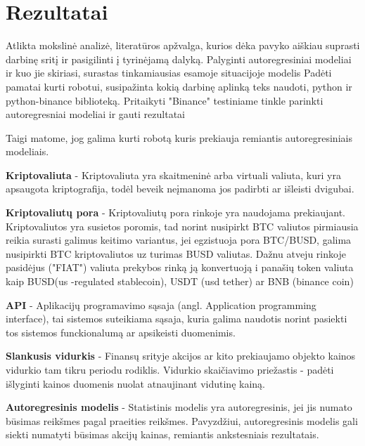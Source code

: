 \documentclass{VUMIFInfKursinis}
\begin{document}

\section{Rezultatai}
Atlikta mokslinė analizė, literatūros apžvalga, kurios dėka pavyko aiškiau suprasti darbinę sritį ir pasigilinti į 
tyrinėjamą dalyką. 
Palyginti autoregresiniai modeliai ir kuo jie skiriasi, surastas tinkamiausias esamoje situacijoje modelis
Padėti pamatai kurti robotui, susipažinta kokią darbinę aplinką teks naudoti, python ir python-binance biblioteką.
Pritaikyti "Binance" testiniame tinkle parinkti autoregresniai modeliai ir gauti rezultatai

Taigi matome, jog galima kurti robotą kuris prekiauja remiantis autoregresiniais modeliais.

\textbf{Kriptovaliuta} - Kriptovaliuta yra skaitmeninė arba virtuali valiuta, kuri yra apsaugota kriptografija, todėl beveik neįmanoma jos padirbti ar išleisti dvigubai.

\textbf{Kriptovaliutų pora} - Kriptovaliutų pora rinkoje yra naudojama prekiaujant. Kriptovaliutos yra susietos poromis, tad norint nusipirkt BTC valiutos pirmiausia reikia surasti 
galimus keitimo variantus, jei egzistuoja pora BTC/BUSD, galima nusipirkti BTC kriptovaliutos uz turimas BUSD valiutas. Dažnu atveju rinkoje pasidėjus ("FIAT") valiuta
prekybos rinką ją konvertuoją i panašių token valiuta kaip BUSD(us -regulated stablecoin), USDT (usd tether) ar BNB (binance coin)

\textbf{API} - Aplikacijų programavimo sąsaja (angl. Application programming interface), tai sistemos suteikiama sąsaja, kuria galima naudotis norint pasiekti tos sistemos
funckionalumą ar apsikeisti duomenimis.

\textbf{Slankusis vidurkis} - Finansų srityje akcijos ar kito prekiaujamo objekto kainos vidurkio tam tikru periodu rodiklis. Vidurkio skaičiavimo priežastis - padėti išlyginti
kainos duomenis nuolat atnaujinant vidutinę kainą.

\textbf{Autoregresinis modelis} - Statistinis modelis yra autoregresinis, jei jis numato būsimas reikšmes pagal praeities reikšmes. Pavyzdžiui, autoregresinis modelis gali
siekti numatyti būsimas akcijų kainas, remiantis ankstesniais rezultatais.
\end{document}
